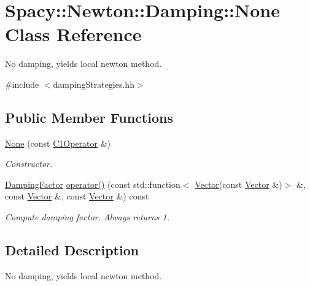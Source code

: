 \hypertarget{classSpacy_1_1Newton_1_1Damping_1_1None}{\section{\-Spacy\-:\-:\-Newton\-:\-:\-Damping\-:\-:\-None \-Class \-Reference}
\label{classSpacy_1_1Newton_1_1Damping_1_1None}
}


\-No damping, yields local newton method.  




{\ttfamily \#include $<$damping\-Strategies.\-hh$>$}

\subsection*{\-Public \-Member \-Functions}
\begin{DoxyCompactItemize}
\item 
\hypertarget{classSpacy_1_1Newton_1_1Damping_1_1None_ac153c7288c074756c6c3eeb8f91eddd4}{\hyperlink{classSpacy_1_1Newton_1_1Damping_1_1None_ac153c7288c074756c6c3eeb8f91eddd4}{\-None} (const \hyperlink{classSpacy_1_1C1Operator}{\-C1\-Operator} \&)}\label{classSpacy_1_1Newton_1_1Damping_1_1None_ac153c7288c074756c6c3eeb8f91eddd4}

\begin{DoxyCompactList}\small\item\em \-Constructor. \end{DoxyCompactList}\item 
\hyperlink{classSpacy_1_1DampingFactor}{\-Damping\-Factor} \hyperlink{classSpacy_1_1Newton_1_1Damping_1_1None_a79351f9d5d55c598f6723aa0e5ff8ff3}{operator()} (const std\-::function$<$ \hyperlink{classSpacy_1_1Vector}{\-Vector}(const \hyperlink{classSpacy_1_1Vector}{\-Vector} \&)$>$ \&, const \hyperlink{classSpacy_1_1Vector}{\-Vector} \&, const \hyperlink{classSpacy_1_1Vector}{\-Vector} \&) const 
\begin{DoxyCompactList}\small\item\em \-Compute damping factor. \-Always returns 1. \end{DoxyCompactList}\end{DoxyCompactItemize}


\subsection{\-Detailed \-Description}
\-No damping, yields local newton method. 

